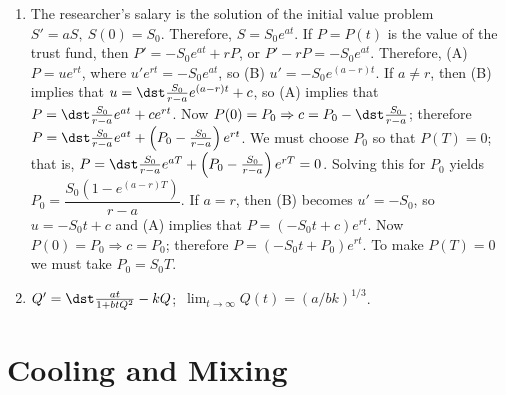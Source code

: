 \documentclass[openany]{book}
\newenvironment{sectionSolutions}{
 \begin{enumerate}[item-label={\thesection.\arabic{enumi}.}]
}{
 \end{enumerate}
}
\begin{document}
\begin{sectionSolutions}
\item
The researcher's salary is the solution of the initial value problem
$S'=aS,\ S(0)=S_0$. Therefore, $S=S_0e^{at}$. If $P=P(t)$ is the value
of the trust fund, then $P'=-S_0e^{at}+rP$, or $P'-rP=-S_0e^{at}$.
Therefore, (A) $P=ue^{rt}$, where $u'e^{rt}=-S_0e^{at}$,
 so (B) $u'=-S_0e^{(a-r)t}$. If $a\ne r$, then (B) implies that
$u=\dst\frac{S_0}{ r-a}e^{(a-r)t}+c$, so (A) implies that
$P=\dst\frac{S_0}{ r-a}e^{at}+ce^{rt}$. Now $P(0)=P_0\Rightarrow
c=P_0-\dst\frac{S_0}{ r-a}$; therefore
$P=\dst\frac{S_0}{ r-a}e^{at}+\left(P_0-\frac{S_0}{ r-a}\right)e^{rt}$.
We must choose $P_0$ so that $P(T)=0$; that is,
$P=\dst\frac{S_0}{ r-a}e^{aT}+\left(P_0-\frac{S_0}{ r-a}\right)e^{rT}=0$.
Solving this for $P_0$ yields
$P_0=\dfrac{S_0(1-e^{(a-r)T})}{ r-a}$.
If $a=r$, then (B) becomes
$u'=-S_0$, so $u=-S_0t+c$ and (A) implies that
$P=(-S_0t+c)e^{rt}$. Now $P(0)=P_0\Rightarrow
c=P_0$; therefore
$P=(-S_0t+P_0)e^{rt}$.
To make $P(T)=0$ we must take $P_0=S_0T$.



\item
$Q'=\dst\frac{at}{1+btQ^2}-kQ$;\  $\lim_{t\to\infty}Q(t)=(a/bk)^{1/3}$.
\end{sectionSolutions}

\section{Cooling and Mixing}
\end{document}
